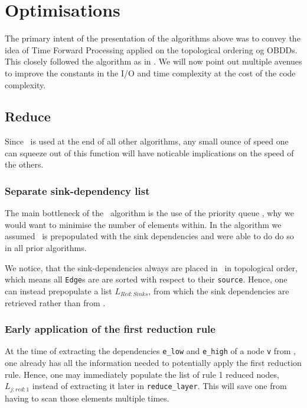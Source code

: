 \section{Optimisations} \label{sec:optimisations}
The primary intent of the presentation of the algorithms above was to convey the
idea of Time Forward Processing applied on the topological ordering og OBDDs.
This closely followed the algorithm as in \cite{Arge96}. We will now point out
multiple avenues to improve the constants in the I/O and time complexity at the
cost of the code complexity.

\subsection{Reduce}
Since \Reduce\ is used at the end of all other algorithms, any small ounce of
speed one can squeeze out of this function will have noticable implications on
the speed of the others.

\subsubsection{Separate sink-dependency list}
The main bottleneck of the \Reduce\ algorithm is the use of the priority queue
\ReduceQdep, why we would want to minimise the number of elements within. In the
algorithm we assumed \ReduceQdep\ is prepopulated with the sink dependencies and
were able to do do so in all prior algorithms.

We notice, that the sink-dependencies always are placed in \ReduceQdep\ in
topological order, which means all \lstinline{Edge}s are are sorted with respect
to their \lstinline{source}. Hence, one can instead prepopulate a list
$L_{\mathit{Red:}Sinks}$, from which the sink dependencies are retrieved rather
than from \ReduceQdep.


\subsubsection{Early application of the first reduction rule}
At the time of extracting the dependencies \lstinline{e_low} and
\lstinline{e_high} of a node \lstinline{v} from \ReduceQdep, one already has all
the information needed to potentially apply the first reduction rule. Hence, one
may immediately populate the list of rule 1 reduced nodes,
$L_{j:\mathit{red}:1}$ instead of extracting it later in
\lstinline{reduce_layer}. This will save one from having to scan those elements
multiple times.

